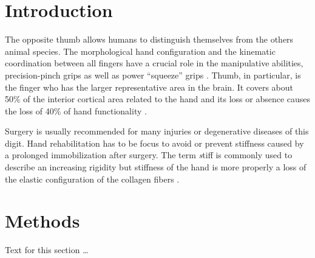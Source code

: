 \documentclass{bmcart}
\begin{document}


\section*{Introduction}

The opposite thumb allows humans to distinguish themselves from the others animal species. The morphological hand configuration and the kinematic coordination between all fingers have a crucial role in the manipulative abilities, precision-pinch grips as well as power “squeeze” grips \cite{napier1956prehensile} \cite{marzke1997precision} \cite{marzke1992evolution}. Thumb, in particular, is the finger who has the larger representative area in the brain. It covers about 50\% of the interior cortical area related to the hand and its loss or absence causes the loss of 40\% of hand functionality \cite{flatt2002our}. 

Surgery is usually recommended for many injuries or degenerative diseases of this digit. Hand rehabilitation has to be focus to avoid or prevent stiffness caused by a prolonged immobilization after surgery.
The term \textit stiff is commonly used to describe an increasing rigidity but stiffness of the hand is more properly a loss of the elastic configuration of the collagen fibers \cite{frank1984physiology}.



\section*{Methods}
Text for this section \ldots
\end{document}

